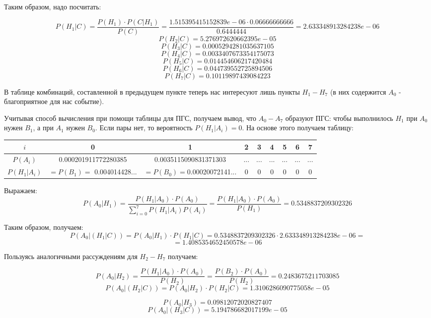 \begin{enumerate}
	Таким образом, надо посчитать:
	
	\[ P(H_1|C) = \dfrac{P(H_1) \cdot P(C|H_1)}{P(C)} = \dfrac{1.515395415152839e-06 \cdot 0.06666666666}{0.6444444} = 2.633348913284238e-06 \]
	\[ P(H_2|C) = 5.276972620662395e-05 \]
	\[ P(H_3|C) = 0.0005294281035637105 \]
	\[ P(H_4|C) = 0.0033407673354175073 \]
	\[ P(H_5|C) = 0.014454606217420484 \]
	\[ P(H_6|C) = 0.044739552725894506 \]
	\[ P(H_7|C) = 0.10119897439084223 \]
	
	В таблице комбинаций, составленной в предыдущем пункте теперь нас интересуют лишь пункты $H_1 - H_7$ (в них содержится $A_0$ - благоприятное для нас событие).
	
	Учитывая способ вычисления при помощи таблицы для ПГС, получаем вывод, что $A_0 - A_7$ образуют ПГС: чтобы выполнилось $H_1$ при $A_0$ нужен $B_1$, а при $A_1$ нужен $B_0$. Если пары нет, то вероятность $P(H_1|A_i) = 0$. На основе этого получаем таблицу:
	
	\begin{table}[H]
		\centering
		\begin{tabular}{|c|c|c|c|c|c|c|c|c|}
			\hline
			$i$          & 0                            & 1                             & 2   & 3   & 4   & 5   & 6   & 7   \\ \hline
			$P(A_i)$     & 0.000201911772280385         & 0.0035115090831371303         & ... & ... & ... & ... & ... & ... \\ \hline
			$P(H_1|A_i)$ & $= P(B_1) = $ 0.004014428... & $= P(B_0) = $0.00020072141... & 0   & 0   & 0   & 0   & 0   & 0   \\ \hline
		\end{tabular}
	\end{table}

	Выражаем:
	\[ P(A_0|H_1) = \dfrac{P(H_1|A_0) \cdot P(A_0)}{\sum\limits_{i=0}^{7} P(H_1|A_i) P(A_i)} = \dfrac{P(H_1|A_0) \cdot P(A_0)}{P(H_1)} = 0.5348837209302326 \]
	
	Таким образом, получаем:
	\[ P(A_0|(H_1|C)) = P(A_0|H_1) \cdot P(H_1|C) = 0.5348837209302326 \cdot 2.633348913284238e-06 = \]
	\[ = 1.4085354652450578e-06 \]
	
	Пользуясь аналогичными рассуждениям для $H_2 - H_7$ получаем:
	
	\[ P(A_0|H_2) = \dfrac{P(H_1|A_0) \cdot P(A_0)}{P(H_2)} = \dfrac{P(B_2) \cdot P(A_0)}{P(H_2)} = 0.2483675211703085 \]
	\[ P(A_0|(H_2|C)) = P(A_0|H_2) \cdot P(H_2|C) = 1.3106286090775058e-05 \]
	
	\[ P(A_0|H_3) = 0.09812072020827407 \]
	\[ P(A_0|(H_3|C)) = 5.194786682017199e-05 \]
	

\end{enumerate}
